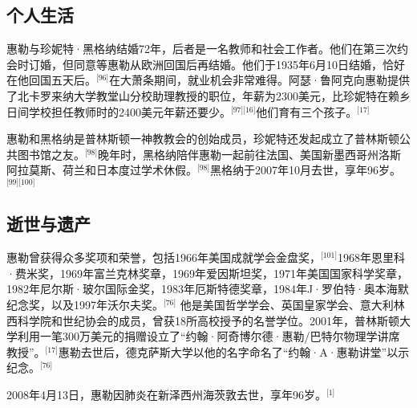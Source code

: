 \subsection{个人生活}
惠勒与珍妮特·黑格纳结婚72年，后者是一名教师和社会工作者。他们在第三次约会时订婚，但同意等惠勒从欧洲回国后再结婚。他们于1935年6月10日结婚，恰好在他回国五天后。\(^\text{[96]}\)在大萧条期间，就业机会非常难得。阿瑟·鲁阿克向惠勒提供了北卡罗来纳大学教堂山分校助理教授的职位，年薪为2300美元，比珍妮特在赖乡日间学校担任教师时的2400美元年薪还要少。\(^\text{[97][16]}\)他们育有三个孩子。\(^\text{[17]}\)

惠勒和黑格纳是普林斯顿一神教教会的创始成员，珍妮特还发起成立了普林斯顿公共图书馆之友。\(^\text{[98]}\)晚年时，黑格纳陪伴惠勒一起前往法国、美国新墨西哥州洛斯阿拉莫斯、荷兰和日本度过学术休假。\(^\text{[98]}\)黑格纳于2007年10月去世，享年96岁。\(^\text{[99][100]}\)
\subsection{逝世与遗产}
惠勒曾获得众多奖项和荣誉，包括1966年美国成就学会金盘奖，\(^\text{[101]}\)1968年恩里科·费米奖，1969年富兰克林奖章，1969年爱因斯坦奖，1971年美国国家科学奖章，1982年尼尔斯·玻尔国际金奖，1983年厄斯特德奖章，1984年J·罗伯特·奥本海默纪念奖，以及1997年沃尔夫奖。\(^\text{[76]}\) 他是美国哲学学会、英国皇家学会、意大利林西科学院和世纪协会的成员，曾获18所高校授予的名誉学位。2001年，普林斯顿大学利用一笔300万美元的捐赠设立了“约翰·阿奇博尔德·惠勒/巴特尔物理学讲席教授”。\(^\text{[17]}\)惠勒去世后，德克萨斯大学以他的名字命名了“约翰·A·惠勒讲堂”以示纪念。\(^\text{[76]}\)

2008年4月13日，惠勒因肺炎在新泽西州海茨敦去世，享年96岁。\(^\text{[1]}\)
